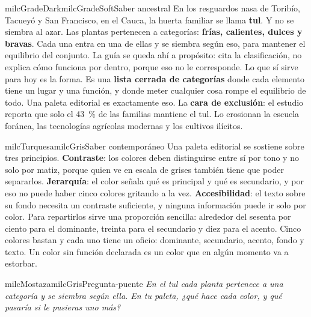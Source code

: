 \documentclass[11pt,letterpaper]{article}
\begin{document}
\begin{softbox}{milcGradeDark}{milcGradeSoft}{Saber ancestral}
En los resguardos nasa de Toribío, Tacueyó y San Francisco, en el Cauca, la huerta familiar se llama \textbf{tul}. Y no se siembra al azar. Las plantas pertenecen a categorías: \textbf{frías, calientes, dulces y bravas}. Cada una entra en una de ellas y se siembra según eso, para mantener el equilibrio del conjunto. La guía se queda ahí a propósito: cita la clasificación, no explica cómo funciona por dentro, porque eso no le corresponde. Lo que sí sirve para hoy es la forma. Es una \textbf{lista cerrada de categorías} donde cada elemento tiene un lugar y una función, y donde meter cualquier cosa rompe el equilibrio de todo. Una paleta editorial es exactamente eso. La \textbf{cara de exclusión}: el estudio reporta que solo el 43~\% de las familias mantiene el tul. Lo erosionan la escuela foránea, las tecnologías agrícolas modernas y los cultivos ilícitos.\par{}
\end{softbox}

\begin{softbox}{milcTurquesa}{milcGris}{Saber contemporáneo}
Una paleta editorial se sostiene sobre tres principios. \textbf{Contraste}: los colores deben distinguirse entre sí por tono y no solo por matiz, porque quien ve en escala de grises también tiene que poder separarlos. \textbf{Jerarquía}: el color señala qué es principal y qué es secundario, y por eso no puede haber cinco colores gritando a la vez. \textbf{Accesibilidad}: el texto sobre su fondo necesita un contraste suficiente, y ninguna información puede ir solo por color. Para repartirlos sirve una proporción sencilla: alrededor del sesenta por ciento para el dominante, treinta para el secundario y diez para el acento. Cinco colores bastan y cada uno tiene un oficio: dominante, secundario, acento, fondo y texto. Un color sin función declarada es un color que en algún momento va a estorbar.
\end{softbox}

\begin{softbox}{milcMostaza}{milcGris}{Pregunta-puente}
\textit{En el tul cada planta pertenece a una categoría y se siembra según ella. En tu paleta, ¿qué hace cada color, y qué pasaría si le pusieras uno más?}
\end{softbox}
\end{document}
